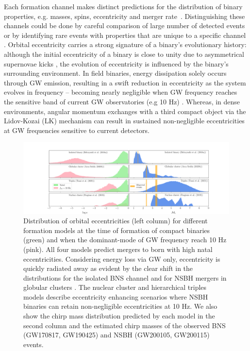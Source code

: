 
Each formation channel makes distinct predictions for the distribution of binary properties, e.g. masses, spins, eccentricity and merger rate~\cite{Mandel:2021smh}. Distinguishing these channels could be done by careful comparison of large number of detected events or by identifying rare events with properties that are unique to a specific channel \cite{Zevin:2020gbd,Zevin:2021rtf,Dhurkunde:2022aek}. Orbital eccentricity carries a strong signature of a binary's evolutionary history: although the initial eccentricity of a binary is close to unity due to asymmetrical supernovae kicks  \cite{Hobbs:2005yx, Verbunt:2017zqi}, the evolution of eccentricity is influenced by the binary's surrounding environment.  In field binaries, energy dissipation solely occurs through GW emission, resulting in a swift reduction in eccentricity as the system evolves in frequency -- becoming nearly negligible when GW frequency reaches the sensitive band of current GW observatories (e.g 10 Hz) \cite{Peters:1964zz}. Whereas, in dense environments, angular momentum exchanges with a third compact object via the Lidov-Kozai (LK) mechanism \cite{LIDOV1962719,Kozai:1962zz, Antognini:2015loa} can result in sustained non-negligible eccentricities at GW frequencies sensitive to current detectors. 

\begin{figure}
        \centering
    \includegraphics[width=\textwidth]{figures/ecc_search/eccentricity_dist.png}
    \caption{Distribution of orbital eccentricities (left column) for different formation models \cite{Belczynski:2017mqx, Sedda:2020wzl,Trani:2021tan,Fragione:2018yrb} at the time of formation of compact binaries (green) and when the dominant-mode of GW frequency reach 10 Hz (pink). All four models predict mergers to born with high natal eccentricities. Considering energy loss via GW only, eccentricity is quickly radiated away as evident by the clear shift in the distributions for the isolated BNS channel \cite{Belczynski:2017mqx} and for NSBH mergers in globular clusters \cite{Sedda:2020wzl}. The nuclear cluster \cite{Fragione:2018yrb} and hierarchical triples \cite{Trani:2021tan} models describe eccentricity enhancing scenarios where NSBH binaries can retain non-negligible eccentricities at 10 Hz. We also show the chirp mass distribution predicted by each model in the second column and the estimated chirp masses of the observed BNS (GW170817, GW190425) and NSBH (GW200105, GW200115) events.}
    \label{fig:eccentricity-dist}    
\end{figure}

